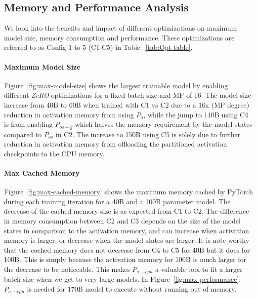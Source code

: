 \documentclass{article}
\newcommand{\name}{\emph{ZeRO}\xspace}
\begin{document}
\subsection{Memory and Performance Analysis}
We look into the benefits and impact of different optimizations on maximum model size, memory consumption and performance. These optimizations are referred to as Config 1 to 5 (C1-C5) in Table.~\ref{tab:Opt-table}.

\paragraph{Maximum Model Size}
Figure~\ref{fig:max-model-size} shows the largest trainable model by enabling different \name optimizations for a fixed batch size and MP of 16. The model size increase from 40B to 60B when trained with C1 vs C2  due to a 16x (MP degree) reduction in activation memory from using $P_a$, while the jump to 140B using C4 is from enabling $P_{os+g}$ which halves the memory requirement by the model states compared to $P_{os}$ in C2. The increase to 150B using C5 is solely due to further reduction in activation memory from offloading the partitioned activation checkpoints to the CPU memory.
\paragraph{Max Cached Memory}
Figure~\ref{fig:max-cached-memory} shows the maximum memory cached by PyTorch during each training iteration for a 40B and a 100B parameter model. The decrease of the cached memory size is as expected from C1 to C2. The difference in memory consumption between C2 and C3 depends on the size of the model states in comparison to the activation memory, and can increase when activation memory is larger, or decrease when the model states are larger. It is note worthy that the cached memory does not decrease from C4 to C5 for 40B but it does for 100B. This is simply because the activation memory for 100B is much larger for the decrease to be noticeable. This makes $P_{a+cpu}$ a valuable tool to fit a larger batch size when we get to very large models. In Figure~\ref{fig:max-performance}, $P_{a+cpu}$ is needed for 170B model to execute without running out of memory.
\end{document}
